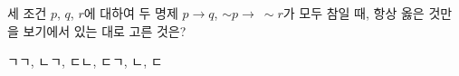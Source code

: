세 조건 $p$, $q$, $r$에 대하여 두 명제 $p\longrightarrow q$, $\sim p\longrightarrow\ \sim r$가 모두 참일 때, 항상 옳은 것만을 보기에서 있는 대로 고른 것은? 
\begin{choices32}{ㄱ}{ㄱ, ㄴ}{ㄱ, ㄷ}{ㄴ, ㄷ}{ㄱ, ㄴ, ㄷ}\end{choices32}
